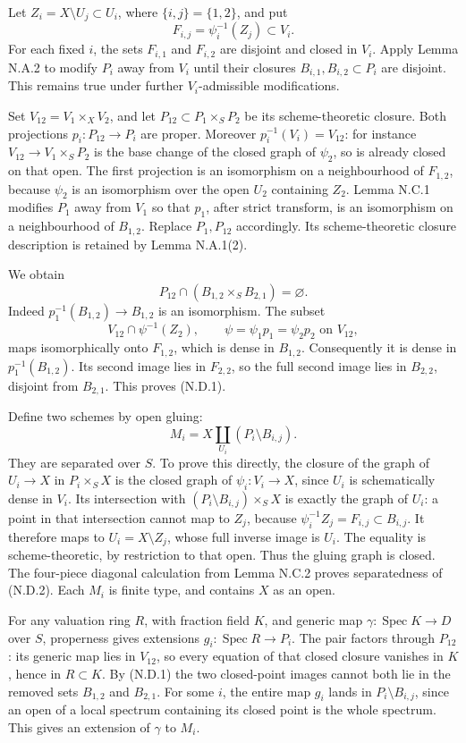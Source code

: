 \documentclass[11pt]{article}
\begin{document}
Let \(Z_i=X\setminus U_j\subset U_i\), where \(\{i,j\}=\{1,2\}\), and
put \[
F_{i,j}=\psi_i^{-1}(Z_j)\subset V_i.
\] For each fixed \(i\), the sets \(F_{i,1}\) and \(F_{i,2}\) are
disjoint and closed in \(V_i\). Apply Lemma N.A.2 to modify \(P_i\) away
from \(V_i\) until their closures \(B_{i,1},B_{i,2}\subset P_i\) are
disjoint. This remains true under further \(V_i\)-admissible
modifications.

Set \(V_{12}=V_1\times_X V_2\), and let
\(P_{12}\subset P_1\times_S P_2\) be its scheme-theoretic closure. Both
projections \(p_i:P_{12}\to P_i\) are proper. Moreover
\(p_i^{-1}(V_i)=V_{12}\): for instance \(V_{12}\to V_1\times_S P_2\) is
the base change of the closed graph of \(\psi_2\), so is already closed
on that open. The first projection is an isomorphism on a neighbourhood
of \(F_{1,2}\), because \(\psi_2\) is an isomorphism over the open
\(U_2\) containing \(Z_2\). Lemma N.C.1 modifies \(P_1\) away from
\(V_1\) so that \(p_1\), after strict transform, is an isomorphism on a
neighbourhood of \(B_{1,2}\). Replace \(P_1,P_{12}\) accordingly. Its
scheme-theoretic closure description is retained by Lemma N.A.1(2).

We obtain \[
P_{12}\cap(B_{1,2}\times_S B_{2,1})=\varnothing.
\tag{N.D.1}
\] Indeed \(p_1^{-1}(B_{1,2})\to B_{1,2}\) is an isomorphism. The subset
\[
V_{12}\cap\psi^{-1}(Z_2),
\qquad \psi=\psi_1p_1=\psi_2p_2\text{ on }V_{12},
\] maps isomorphically onto \(F_{1,2}\), which is dense in \(B_{1,2}\).
Consequently it is dense in \(p_1^{-1}(B_{1,2})\). Its second image lies
in \(F_{2,2}\), so the full second image lies in \(B_{2,2}\), disjoint
from \(B_{2,1}\). This proves (N.D.1).

Define two schemes by open gluing: \[
M_i=X\coprod_{U_i}(P_i\setminus B_{i,j}).
\tag{N.D.2}
\] They are separated over \(S\). To prove this directly, the closure of
the graph of \(U_i\to X\) in \(P_i\times_S X\) is the closed graph of
\(\psi_i:V_i\to X\), since \(U_i\) is schematically dense in \(V_i\).
Its intersection with \((P_i\setminus B_{i,j})\times_S X\) is exactly
the graph of \(U_i\): a point in that intersection cannot map to
\(Z_j\), because \(\psi_i^{-1}Z_j=F_{i,j}\subset B_{i,j}\). It therefore
maps to \(U_i=X\setminus Z_j\), whose full inverse image is \(U_i\). The
equality is scheme-theoretic, by restriction to that open. Thus the
gluing graph is closed. The four-piece diagonal calculation from Lemma
N.C.2 proves separatedness of (N.D.2). Each \(M_i\) is finite type, and
contains \(X\) as an open.

For any valuation ring \(R\), with fraction field \(K\), and generic map
\(\gamma:\operatorname{Spec}K\to D\) over \(S\), properness gives
extensions \(g_i:\operatorname{Spec}R\to P_i\). The pair factors through
\(P_{12}\): its generic map lies in \(V_{12}\), so every equation of
that closed closure vanishes in \(K\), hence in \(R\subset K\). By
(N.D.1) the two closed-point images cannot both lie in the removed sets
\(B_{1,2}\) and \(B_{2,1}\). For some \(i\), the entire map \(g_i\)
lands in \(P_i\setminus B_{i,j}\), since an open of a local spectrum
containing its closed point is the whole spectrum. This gives an
extension of \(\gamma\) to \(M_i\).
\end{document}
